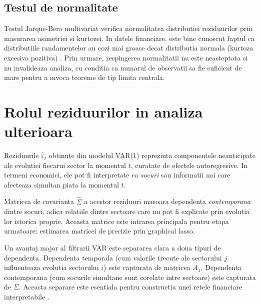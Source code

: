 \subsection{Testul de normalitate}

Testul Jarque-Bera multivariat verifica normalitatea distributiei reziduurilor
prin masurarea asimetriei si kurtozei. In datele financiare, este bine cunoscut
faptul ca distributiile randamentelor au cozi mai groase decat distributia
normala (kurtoza excesiva pozitiva) \citep{cont2001}. Prin urmare, respingerea
normalitatii nu este neasteptata si nu invalideaza analiza, cu conditia ca
numarul de observatii sa fie suficient de mare pentru a invoca teoreme de tip
limita centrala.

\section{Rolul reziduurilor in analiza ulterioara}

Reziduurile $\hat{\varepsilon}_t$ obtinute din modelul VAR(1) reprezinta
componentele neanticipate ale evolutiei fiecarui sector la momentul $t$,
curatate de efectele autoregresive. In termeni economici, ele pot fi interpretate
ca \textit{socuri} sau informatii noi care afecteaza simultan piata la momentul $t$.

Matricea de covarianta $\hat{\Sigma}$ a acestor reziduuri masoara dependenta
\textit{contemporana} dintre socuri, adica relatiile dintre sectoare care nu
pot fi explicate prin evolutia lor istorica proprie. Aceasta matrice este intrarea
principala pentru etapa urmatoare: estimarea matricei de precizie prin graphical
lasso.

Un avantaj major al filtrarii VAR este separarea clara a doua tipuri de
dependenta. Dependenta temporala (cum valorile trecute ale sectorului $j$
influenteaza evolutia sectorului $i$) este capturata de matricea $A_1$.
Dependenta contemporana (cum socurile simultane sunt corelate intre sectoare)
este capturata de $\Sigma$. Aceasta separare este esentiala pentru constructia
unei retele financiare interpretabile \citep{lutkepohl2005,friedman2008}.